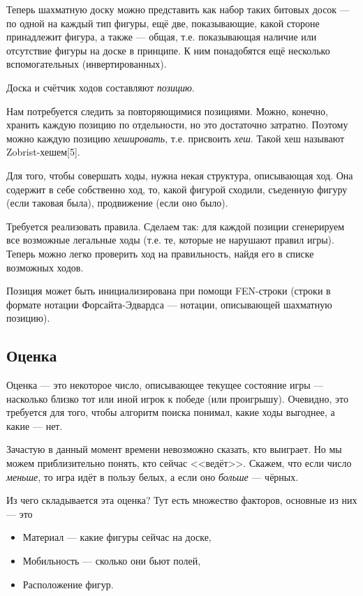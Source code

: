 {	Теперь шахматную доску можно представить как набор таких битовых досок --- по одной на каждый тип фигуры, ещё две, показывающие, какой стороне принадлежит фигура, а также --- общая, т.е. показывающая наличие или отсутствие фигуры на доске в принципе. К ним понадобятся ещё несколько вспомогательных (инвертированных).
	
	Доска и счётчик ходов составляют \textit{позицию}.
	
	Нам потребуется следить за повторяющимися позициями. Можно, конечно, хранить каждую позицию по отдельности, но это достаточно затратно. Поэтому можно каждую позицию \textit{хешировать}, т.е. присвоить \textit{хеш}. Такой хеш называют Zobrist-хешем[5].
	
	Для того, чтобы совершать ходы, нужна некая структура, описывающая ход. Она содержит в себе собственно ход, то, какой фигурой сходили, съеденную фигуру (если таковая была), продвижение (если оно было).
	
	Требуется реализовать правила. Сделаем так: для каждой позиции сгенерируем все возможные легальные ходы (т.е. те, которые не нарушают правил игры). Теперь можно легко проверить ход на правильность, найдя его в списке возможных ходов.
	
	Позиция может быть инициализирована при помощи FEN-строки (строки в формате нотации Форсайта-Эдвардса --- нотации, описывающей шахматную позицию).
	
	\subsection{Оценка}
	 
	 Оценка --- это некоторое число, описывающее текущее состояние игры --- насколько близко тот или иной игрок к победе (или проигрышу). Очевидно, это требуется для того, чтобы алгоритм поиска понимал, какие ходы выгоднее, а какие --- нет. 
	 
	 Зачастую в данный момент времени невозможно сказать, кто выиграет. Но мы можем приблизительно понять, кто сейчас <<ведёт>>. Скажем, что если число \textit{меньше}, то игра идёт в пользу белых, а если оно \textit{больше} --- чёрных. 
	 
	 Из чего складывается эта оценка? Тут есть множество факторов, основные из них --- это
	 
	 \begin{itemize}
	 	\item Материал --- какие фигуры сейчас на доске,
	 	\item Мобильность --- сколько они бьют полей,
	 	\item Расположение фигур.
	 \end{itemize} 
 	
}
